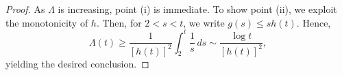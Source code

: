 \documentclass[10pt,a4paper]{amsart}
\begin{document}
\begin{proof}
As $\Lambda$ is increasing, point (i) is immediate.
To show point (ii), we exploit the monotonicity of $h$.
Then, for $2<s<t$, we write $g(s)\leq sh(t)$. Hence,
$$\Lambda(t)\geq \frac{1}{[h(t)]^2} \int_2^t\frac{1}{s}\,ds
\sim \frac{\log t}{[h(t)]^2},$$
yielding the desired conclusion.
\end{proof}
\end{document}
